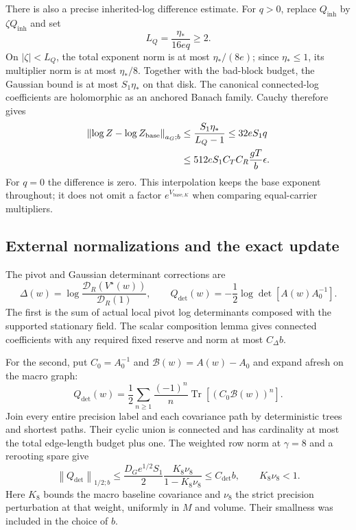 \documentclass[11pt]{article}
\theoremstyle{remark}
\newcommand{\norm}[1]{\left\|#1\right\|}
\begin{document}
There is also a precise inherited-log difference estimate.
For $q>0$, replace $Q_{\mathrm{inh}}$ by
$\zeta Q_{\mathrm{inh}}$ and set
\begin{equation}
 L_Q=\frac{\eta_*}{16e q}\ge2.
 \label{cdm-log-interpolation-radius}
\end{equation}
On $|\zeta|<L_Q$, the total exponent norm is at most
$\eta_*/(8e)$; since $\eta_*\le1$, its multiplier norm is
at most $\eta_*/8$. Together with the bad-block budget,
the Gaussian bound is at most $S_1\eta_*$ on that disk.
The canonical connected-log coefficients are holomorphic
as an anchored Banach family. Cauchy therefore gives
\begin{align}
 \norm{\log Z-\log Z_{\mathrm{base}}}_{a_G;b}
 &\le\frac{S_1\eta_*}{L_Q-1}
 \le32eS_1q\notag\\
 &\le512eS_1C_TC_R\frac{gT}{b}\epsilon .
 \label{cdm-log-difference}
\end{align}
For $q=0$ the difference is zero. This interpolation keeps
the base exponent throughout; it does not omit a factor
$e^{V_{\mathrm{base},K}}$ when comparing equal-carrier
multipliers.

\subsection{External normalizations and the exact update}
\label{cdm-update-section}

The pivot and Gaussian determinant corrections are
\begin{equation}
 \Delta(w)=\log\frac{\mathcal D_R(V^\star(w))}
                         {\mathcal D_R(1)},\qquad
 Q_{\det}(w)=-\frac12\log\det[A(w)A_0^{-1}].
 \label{cdm-external-logs}
\end{equation}
The first is the sum of actual local pivot log determinants
composed with the supported stationary field. The scalar
composition lemma gives connected coefficients with any
required fixed reserve and norm at most $C_\Delta b$.

For the second, put $C_0=A_0^{-1}$ and
$\mathcal B(w)=A(w)-A_0$ and expand afresh on the macro graph:
\begin{equation}
 Q_{\det}(w)=\frac12\sum_{n\ge1}\frac{(-1)^n}{n}
                         \operatorname{Tr}[(C_0\mathcal B(w))^n].
 \label{cdm-det-series}
\end{equation}
Join every entire precision label and each covariance path
by deterministic trees and shortest paths. Their cyclic
union is connected and has cardinality at most the total
edge-length budget plus one. The weighted row norm at
$\gamma=8$ and a rerooting spare give
\begin{equation}
 \norm{Q_{\det}}_{1/2;b}
 \le\frac{D_Ge^{1/2}S_1}{2}
       \frac{K_8\nu_8}{1-K_8\nu_8}
 \le C_{\det}b,\qquad K_8\nu_8<1.
 \label{cdm-det-bound}
\end{equation}
Here $K_8$ bounds the macro baseline covariance and $\nu_8$
the strict precision perturbation at that weight, uniformly
in $M$ and volume. Their smallness was included in the
choice of $b$.
\end{document}
